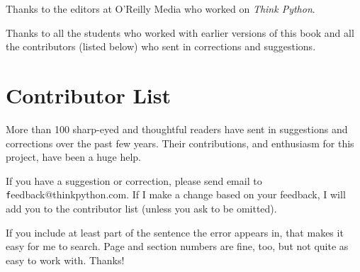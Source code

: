 \documentclass[
DIV=11,
fontsize=13,
twoside,
headinclude=false,
titlepage=firstiscover,
abstract=true,
headsepline=true,
footsepline=true,
chapterprefix=true, %
headings=big,
bibliography=totoc,%
captions=tableheading
]{scrbook}
\theoremstyle{definition}
\begin{document}
Thanks to the editors at O'Reilly Media who worked on
{\em Think Python}.

Thanks to all the students who worked with earlier
versions of this book and all the contributors (listed
below) who sent in corrections and suggestions.


\section*{Contributor List}

More than 100 sharp-eyed and thoughtful readers have sent in
suggestions and corrections over the past few years.  Their
contributions, and enthusiasm for this project, have been a
huge help.

If you have a suggestion or correction, please send email to 
{\texttt feedback@thinkpython.com}.  If I make a change based on your
feedback, I will add you to the contributor list
(unless you ask to be omitted).

If you include at least part of the sentence the
error appears in, that makes it easy for me to search.  Page and
section numbers are fine, too, but not quite as easy to work with.
Thanks!
\end{document}
